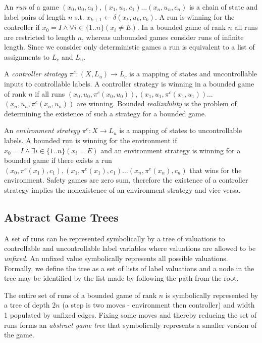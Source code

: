 \documentclass{llncs}
\begin{document}
An \emph{run} of a game $(x_0, u_0, c_0), (x_1, u_1, c_1) \dots (x_n, u_n,
c_n)$ is a chain of state and label pairs of length $n$ s.t.  $x_{k+1}
\leftarrow \delta(x_k, u_k, c_k)$. A run is winning for the controller if $x_0
= I \land \forall i \in \{1..n\} (x_i \neq E)$. In a bounded game of rank $n$
all runs are restricted to length $n$, whereas unbounded games consider runs of
infinite length. Since we consider only deterministic games a run is equivalent
to a list of assignments to $L_c$ and $L_u$.

A \emph{controller strategy} $\pi^c : (X, L_u) \to L_c$ is a mapping of states
and uncontrollable inputs to controllable labels. A controller strategy is
winning in a bounded game of rank $n$ if all runs $(x_0, u_0, \pi^c(x_0, u_0)),
(x_1, u_1, \pi^c(x_1, u_1)) \dots$ $(x_n, u_n, \pi^c(x_n, u_n))$ are winning.
Bounded \emph{realizability} is the problem of determining the existence of
such a strategy for a bounded game.

An \emph{environment strategy} $\pi^e : X \to L_u$ is a mapping of states to
uncontrollable labels. A bounded run is winning for the environment if $x_0
= I \land \exists i \in \{1..n\} (x_i = E)$ and an environment strategy is
winning for a bounded game if there exists a run $(x_0, \pi^e(x_1), c_1), (x_1,
\pi^e(x_1), c_1) \dots (x_n, \pi^e(x_n), c_n)$ that wins for the environment.
Safety games are zero sum, therefore the existence of a controller strategy
implies the nonexistence of an environment strategy and vice versa.

\subsection{Abstract Game Trees}

A set of runs can be represented symbolically by a tree of valuations to
controllable and uncontrollable label variables where valuations are allowed to
be \emph{unfixed}. An unfixed value symbolically represents all possible
valuations. Formally, we define the tree as a set of lists of label valuations
and a node in the tree may be identified by the list made by following the path
from the root.

The entire set of runs of a bounded game of rank $n$ is symbolically
represented by a tree of depth $2n$ (a step is two moves - environment then
controller) and width 1 populated by unfixed edges.  Fixing some moves and
thereby reducing the set of runs forms an \emph{abstract game tree} that
symbolically represents a smaller version of the game.
\end{document}
